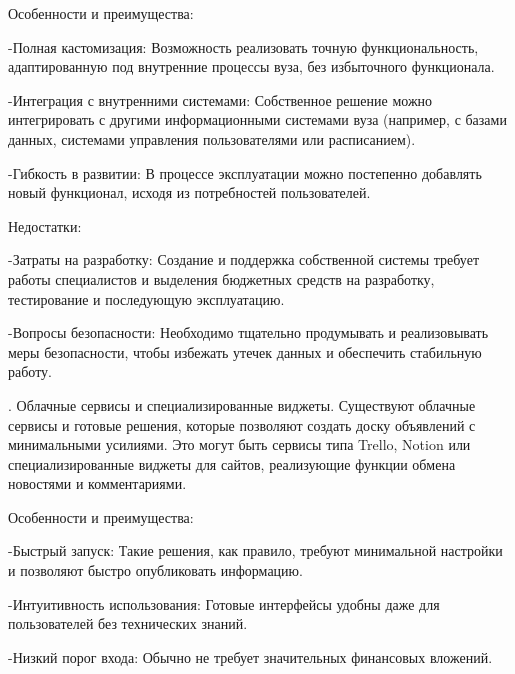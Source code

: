 {	\par \redline Особенности и преимущества:
	
	\par \redline -Полная кастомизация: Возможность реализовать точную функциональность, адаптированную под внутренние процессы вуза, без избыточного функционала.
	
	\par \redline -Интеграция с внутренними системами: Собственное решение можно интегрировать с другими информационными системами вуза (например, с базами данных, системами управления пользователями или расписанием).
	
	\par \redline -Гибкость в развитии: В процессе эксплуатации можно постепенно добавлять новый функционал, исходя из потребностей пользователей.
	
	\par \redline Недостатки:
	
	\par \redline -Затраты на разработку: Создание и поддержка собственной системы требует работы специалистов и выделения бюджетных средств на разработку, тестирование и последующую эксплуатацию.
	
	\par \redline -Вопросы безопасности: Необходимо тщательно продумывать и реализовывать меры безопасности, чтобы избежать утечек данных и обеспечить стабильную работу.   
	
	\par {}. Облачные сервисы и специализированные виджеты. Существуют облачные сервисы и готовые решения, которые позволяют создать доску объявлений с минимальными усилиями. Это могут быть сервисы типа Trello, Notion или специализированные виджеты для сайтов, реализующие функции обмена новостями и комментариями.
	
	\par \redline Особенности и преимущества:
	
	\par \redline -Быстрый запуск: Такие решения, как правило, требуют минимальной настройки и позволяют быстро опубликовать информацию.
	
	\par \redline -Интуитивность использования: Готовые интерфейсы удобны даже для пользователей без технических знаний.
	
	\par \redline -Низкий порог входа: Обычно не требует значительных финансовых вложений.
	
}
